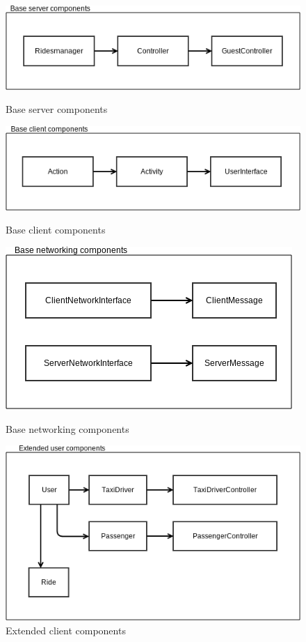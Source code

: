\begin{figure} [h]
  \centering
  \includegraphics[scale=0.72]{diagrams/point 1.png}
  \caption{\label{fig:base_serv_comp} Base server components}
  \vspace{3mm}
  \includegraphics[scale=0.6]{diagrams/point 2.png}
  \caption{\label{fig:base_client_comp} Base client components}
  \vspace{3mm}
  \includegraphics[scale=0.72]{diagrams/point 3.png}
  \caption{\label{fig:base_net_comp} Base networking components}
  \vspace{3mm}
  \includegraphics[scale=0.68]{diagrams/point 5.png}
  \caption{\label{fig:ext_client_comp} Extended client components}
\end{figure}

